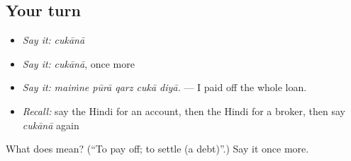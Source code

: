 \subsection*{Your turn}
\begin{itemize}
\raggedright
  \item \emph{Say it:} \emph{cukānā}
  \item \emph{Say it:} \emph{cukānā}, once more
  \item \emph{Say it:} \emph{maiṁne pūrā qarz cukā diyā.} — I paid off the whole loan.
  \item \emph{Recall:} say the Hindi for an account, then the Hindi for a broker, then say \emph{cukānā} again
\end{itemize}

\begin{tcolorbox}[breakable,colback=teal!4,colframe=teal!35!black,title={Before you move on}]
What does  mean? (\textquotedblleft{}To pay off; to settle (a debt)\textquotedblright{}.) Say it once more.
\end{tcolorbox}
